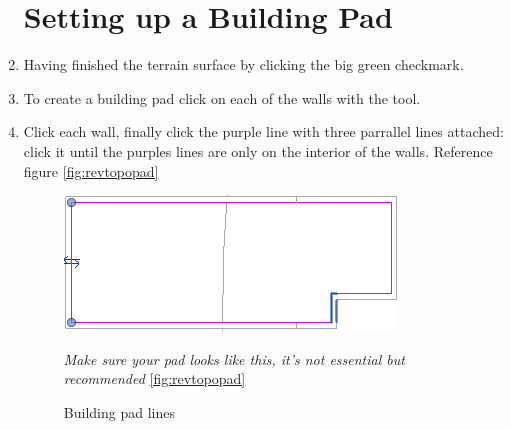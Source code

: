 \documentclass{tufte-book} %
\begin{document}
\begin{enumerate}
	\section{Setting up a Building Pad}
	\item Having finished the terrain surface by clicking the big green checkmark.
	\item To create a building pad click on each of the walls with the  tool.
	\item Click each wall, finally click the purple line with three parrallel lines attached: click it until the purples lines are only on the interior of the walls. Reference figure \ref{fig:revtopopad}
	\begin{figure}
		\includegraphics[width=\linewidth]{revittopographicpad.png}
		\caption{Building pad lines}
		\emph{Make sure your pad looks like this, it's not essential but recommended}
		\ref{fig:revtopopad}
	\end{figure}
\end{enumerate}
	



\backmatter




\printindex %
\end{document}
